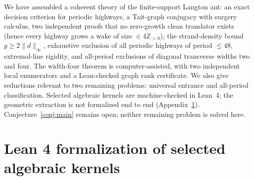 \documentclass[11pt,reqno]{amsart}
\theoremstyle{plain}
\theoremstyle{definition}
\newcommand{\Z}{\mathbb{Z}}
\newcommand{\drift}{d}
\newcommand{\growth}{g}
\begin{document}
We have assembled a coherent theory of the finite-support Langton ant: an exact
decision criterion for periodic highways, a Tait-graph conjugacy with surgery
calculus, two independent proofs that no zero-growth clean translator exists
(hence every highway grows a wake of size $\in4\Z_{>0}$), the strand-density
bound $\growth\ge2\|\drift\|_\infty$, exhaustive exclusion of all periodic
highways of period $\le48$, extremal-line rigidity, and all-period exclusions of
diagonal transverse widths two and four.  The width-four theorem is
computer-assisted, with two independent local enumerators and a Lean-checked graph
rank certificate.  We also give reductions relevant to two remaining problems:
universal entrance and all-period classification. Selected algebraic kernels are
machine-checked in Lean~4; the geometric extraction is not formalized end to end
(Appendix~\ref{app:lean}).
Conjecture~\ref{conj:main} remains open; neither remaining problem is solved
here.

\appendix
\section{Lean 4 formalization of selected algebraic kernels}\label{app:lean}
\end{document}
